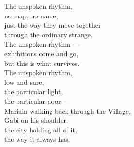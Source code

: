 \begin{lyrics}
The unspoken rhythm,\\
no map, no name,\\
just the way they move together\\
through the ordinary strange.\\
The unspoken rhythm —\\
exhibitions come and go,\\
but this is what survives.\\
The unspoken rhythm,\\
low and sure,\\
the particular light,\\
the particular door —\\
Mariain walking back through the Village,\\
Gabi on his shoulder,\\
the city holding all of it,\\
the way it always has.

\end{lyrics}

